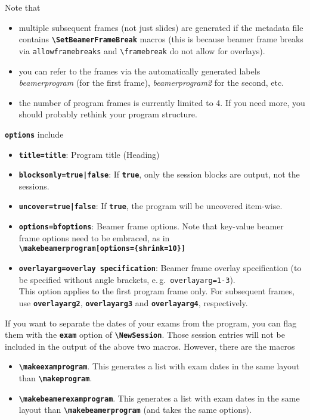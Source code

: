 \documentclass[english]{article}
\newcommand*\jmacro[1]{\textbf{\texttt{#1}}}
\newcommand*\jcsmacro[1]{\jmacro{\textbackslash{#1}}}
\newcommand*\joption[1]{\textbf{\texttt{#1}}}
\newcommand*\jfoption[1]{\texttt{#1}}
\newcommand*\jfmacro[1]{\texttt{#1}}
\newcommand*\jfcsmacro[1]{\jfmacro{\textbackslash{#1}}}
\newcommand*\jparam[1]{\angus #1\angud}
\begin{document}
\begin{itemize}
Note that 
\begin{itemize}
	\item multiple subsequent frames (not just slides) are generated if the metadata
	      file contains \jcsmacro{SetBeamerFrameBreak} macros (this is because beamer frame breaks
	      via \jfoption{allowframebreaks} and \jfcsmacro{framebreak} do not allow for overlays).
	\item you can refer to the frames via the automatically generated
	      labels \emph{beamerprogram} (for the first frame), \emph{beamerprogram2}
	       for the second, etc. 
	\item the number of program frames is currently limited to 4. If you need more, you should probably rethink
	      your program structure.
\end{itemize}
%
\joption{\jparam{options}} include
\begin{itemize}
\item \joption{title=\jparam{title}}: Program title (\jparam{Heading})
\item \joption{blocksonly=\jparam{true|false}}: If \joption{true}, only the session blocks are output,
      not the sessions.
\item \joption{uncover=\jparam{true|false}}: If \joption{true}, the program will be uncovered item-wise.
\item \joption{options=\jparam{bfoptions}}: Beamer frame options. Note that key-value
    beamer frame options need to be embraced, as in\\
    \jcsmacro{makebeamerprogram[options=\{shrink=10\}]}
\item \joption{overlayarg=\jparam{overlay specification}}: Beamer frame overlay specification
     (to be specified without angle brackets, e.\,g.\ \jfoption{overlayarg=1-3}).\\
     This option applies to the first program frame only. For subsequent frames,
     use \joption{overlayarg2}, \joption{overlayarg3} and \joption{overlayarg4},
     respectively.
\end{itemize}

\end{itemize}
%
If you want to separate the dates of your exams from the program, you can flag them with
the \joption{exam} option of \jcsmacro{NewSession}. Those session entries will not be included
in the output of the above two macros. However, there are the macros

\begin{itemize}
	\item \jcsmacro{makeexamprogram}. This generates a list with exam dates in the same layout
	      than \jcsmacro{makeprogram}.
	\item \jcsmacro{makebeamerexamprogram}. This generates a list with exam dates in the same layout
	      than \jcsmacro{makebeamerprogram} (and takes the same options).
\end{itemize}
\end{document}
